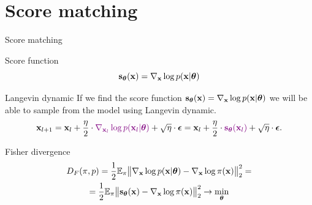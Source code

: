 \section{Score matching}
\begin{frame}{Score matching}
	\begin{block}{Score function}
		\vspace{-0.3cm}
		 \[
			 \mathbf{s}_{\boldsymbol{\theta}}(\mathbf{x}) = \nabla_{\mathbf{x}}\log p(\mathbf{x}| \boldsymbol{\theta})
		 \]
		\vspace{-0.5cm} 
	\end{block}
	\begin{block}{Langevin dynamic}
		If we find the score function $\mathbf{s}_{\boldsymbol{\theta}}(\mathbf{x}) = \nabla_{\mathbf{x}}\log p(\mathbf{x}| \boldsymbol{\theta})$ we will be able to sample from the model using Langevin dynamic. 
		\[
			\mathbf{x}_{l + 1} = \mathbf{x}_l + \frac{\eta}{2} \cdot {\color{violet}\nabla_{\mathbf{x}_l} \log p(\mathbf{x}_l | \boldsymbol{\theta})} + \sqrt{\eta} \cdot \boldsymbol{\epsilon} = \mathbf{x}_l + \frac{\eta}{2} \cdot  {\color{violet}\mathbf{s}_{\boldsymbol{\theta}}(\mathbf{x}_l)} + \sqrt{\eta} \cdot \boldsymbol{\epsilon}.
		\] 
		\vspace{-0.5cm} 
	\end{block}
	\begin{block}{Fisher divergence}
		\vspace{-0.5cm}
		\begin{multline*}
			D_F(\pi, p) = \frac{1}{2}\mathbb{E}_{\pi}\bigl\| \nabla_{\mathbf{x}}\log p(\mathbf{x}| \boldsymbol{\theta}) - \nabla_{\mathbf{x}} \log \pi(\mathbf{x}) \bigr\|^2_2 = \\ 
			= \frac{1}{2}\mathbb{E}_{\pi}\bigl\| \mathbf{s}_{\boldsymbol{\theta}}(\mathbf{x}) - \nabla_{\mathbf{x}} \log \pi(\mathbf{x}) \bigr\|^2_2 \rightarrow \min_{\boldsymbol{\theta}}
		\end{multline*}
		\vspace{-0.3cm}
	\end{block}
\end{frame}
